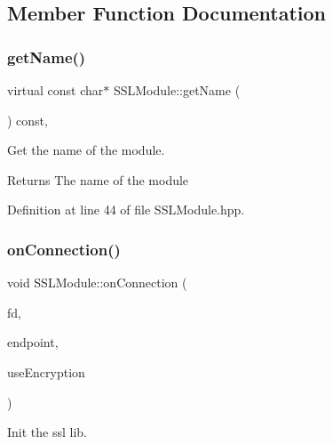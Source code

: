 \subsection{Member Function Documentation}
\mbox{\label{class_s_s_l_module_a811d3b0f9f932791abbc89f1ecf2a1c3}} 
\subsubsection{\texorpdfstring{get\+Name()}{getName()}}
{\footnotesize\ttfamily virtual const char$\ast$ S\+S\+L\+Module\+::get\+Name (\begin{DoxyParamCaption}\item[{void}]{ }\end{DoxyParamCaption}) const\hspace{0.3cm}{\ttfamily [inline]}, {\ttfamily [virtual]}}



Get the name of the module. 

\begin{DoxyReturn}{Returns}
The name of the module 
\end{DoxyReturn}


Definition at line 44 of file S\+S\+L\+Module.\+hpp.

\mbox{\label{class_s_s_l_module_a514e3d618be55df6f5fc2f489e70d915}} 
\subsubsection{\texorpdfstring{on\+Connection()}{onConnection()}}
{\footnotesize\ttfamily void S\+S\+L\+Module\+::on\+Connection (\begin{DoxyParamCaption}\item[{const o\+Z\+::\+File\+Descriptor}]{fd,  }\item[{const o\+Z\+::\+Endpoint}]{endpoint,  }\item[{const bool}]{use\+Encryption }\end{DoxyParamCaption})\hspace{0.3cm}{\ttfamily [virtual]}}



Init the ssl lib. 


